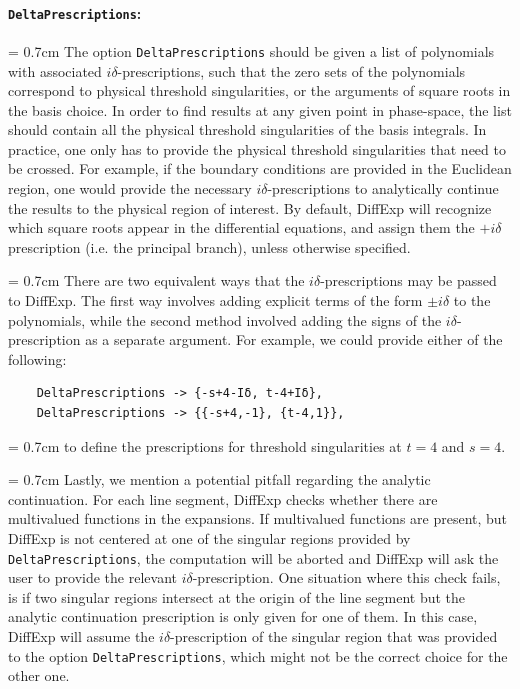 \documentclass{article}
\begin{document}
{
\paragraph{\texttt{DeltaPrescriptions}:} 
\parindent = 0.7cm \hangindent=0.7cm
The option \texttt{DeltaPrescriptions} should be given a list of polynomials with associated $i\delta$-prescriptions, such that the zero sets of the polynomials correspond to physical threshold singularities, or the arguments of square roots in the basis choice. In order to find results at any given point in phase-space, the list should contain all the physical threshold singularities of the basis integrals. In practice, one only has to provide the physical threshold singularities that need to be crossed. For example, if the boundary conditions are provided in the Euclidean region, one would provide the necessary $i\delta$-prescriptions to analytically continue the results to the physical region of interest. By default, DiffExp will recognize which square roots appear in the differential equations, and assign them the $+i\delta$ prescription (i.e. the principal branch), unless otherwise specified.

\parindent = 0.7cm \hangindent=0.7cm
There are two equivalent ways that the $i\delta$-prescriptions may be passed to DiffExp. The first way involves adding explicit terms of the form $\pm i\delta$ to the polynomials, while the second method involved adding the signs of the $i\delta$-prescription as a separate argument. For example, we could provide either of the following:
\begin{verbatim}
    DeltaPrescriptions -> {-s+4-Iδ, t-4+Iδ},
    DeltaPrescriptions -> {{-s+4,-1}, {t-4,1}},
\end{verbatim}

\parindent = 0.7cm \hangindent=0.7cm
to define the prescriptions for threshold singularities at $t = 4$ and $s=4$.

\parindent = 0.7cm \hangindent=0.7cm
Lastly, we mention a potential pitfall regarding the analytic continuation. For each line segment, DiffExp checks whether there are multivalued functions in the expansions. If multivalued functions are present, but DiffExp is not centered at one of the singular regions provided by \texttt{DeltaPrescriptions}, the computation will be aborted and DiffExp will ask the user to provide the relevant $i\delta$-prescription. One situation where this check fails, is if two singular regions intersect at the origin of the line segment but the analytic continuation prescription is only given for one of them. In this case, DiffExp will assume the $i\delta$-prescription of the singular region that was provided to the option \texttt{DeltaPrescriptions}, which might not be the correct choice for the other one.

}
\end{document}
